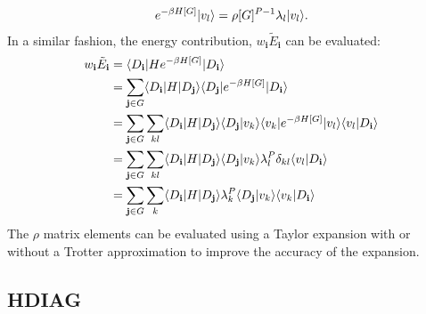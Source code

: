 \documentclass[openany,a4paper,10pt,english]{manual}
\newcommand{\bra}{\ensuremath{\langle}}
\newcommand{\ket}{\ensuremath{\rangle}}
\newcommand{\veci}{\ensuremath{\mathbf{i}}}
\newcommand{\vecj}{\ensuremath{\mathbf{j}}}
\begin{document}
\begin{gather}
\begin{split}e^{-\beta H[G]} | v_l \ket = \rho[G]^{P-1} \lambda_l | v_l \ket.\end{split}\notag
\end{gather}
In a similar fashion, the energy contribution, $w_{\veci}\tilde{E}_{\veci}$ can be evaluated:
\begin{gather}
\begin{split}w_{\veci}\tilde{E}_{\veci} & = \bra D_{\veci} | H e^{-\beta H[G]} | D_{\veci} \ket \\
                           & = \sum_{\vecj \in G} \bra D_{\veci} | H | D_{\vecj} \ket \bra D_{\vecj} | e^{-\beta H[G]} | D_{\veci} \ket \\
                           & = \sum_{\vecj \in G} \sum_{kl} \bra D_{\veci} | H | D_{\vecj} \ket \bra D_{\vecj} | v_k \ket \bra v_k |  e^{-\beta H[G]} | v_l \ket \bra v_l | D_{\veci} \ket \\
                           & = \sum_{\vecj \in G} \sum_{kl}  \bra D_{\veci} | H | D_{\vecj} \ket \bra D_{\vecj} | v_k \ket \lambda_l^P \delta_{kl} \bra v_l | D_{\veci} \ket \\
                           & = \sum_{\vecj \in G} \sum_{k} \bra D_{\veci} | H | D_{\vecj} \ket \lambda_k^P \bra D_{\vecj} | v_k \ket \bra v_k | D_{\veci} \ket\end{split}\notag
\end{gather}
The $\rho$ matrix elements can be evaluated using a Taylor expansion
with or without a Trotter approximation to improve the accuracy of the expansion.


\subsection{\textbf{HDIAG}}
\end{document}
